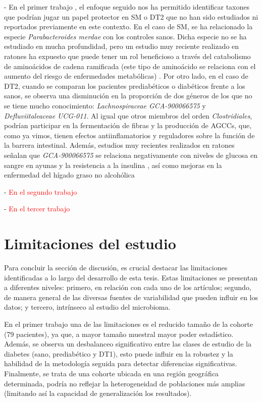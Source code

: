 - En el primer trabajo \cite{paper1}, el enfoque seguido nos ha permitido identificar taxones que podrían jugar un papel protector en SM o DT2 que no han sido estudiados ni reportados previamente en este contexto. En el caso de SM, se ha relacionado la especie \textit{Parabacteroides merdae} con los controles sanos. Dicha especie no se ha estudiado en mucha profundidad, pero un estudio muy reciente realizado en ratones ha expuesto que puede tener un rol beneficioso a través del catabolismo de aminoácidos de cadena ramificada (este tipo de aminoácido se relaciona con el aumento del riesgo de enfermedades metabólicas) \cite{qiao2022gut}. Por otro lado, en el caso de DT2, cuando se comparan los pacientes prediabéticos o diabéticos frente a los sanos, se observa una disminución en la proporción de dos géneros de los que no se tiene mucho conocimiento: \textit{Lachnospiraceae GCA-900066575} y \textit{Defluviitaleaceae UCG-011}. Al igual que otros miembros del orden \textit{Clostridiales}, podrían participar en la fermentación de fibras y la producción de AGCCs, que, como ya vimos, tienen efectos antiinflamatorios y reguladores sobre la función de la barrera intestinal. Además, estudios muy recientes realizados en ratones señalan que \textit{GCA-900066575} se relaciona negativamente con niveles de glucosa en sangre en ayunas y la resistencia a la insulina \cite{liu2023vitamin}, así como mejoras en la enfermedad del hígado graso no alcohólica \cite{qu2023akkermansia, guo2023protective}


- \textcolor{red}{En el segundo trabajo \cite{paper2}}



- \textcolor{red}{En el tercer trabajo \cite{paper3}}



\section{Limitaciones del estudio}

Para concluir la sección de discusión, es crucial destacar las limitaciones identificadas a lo largo del desarrollo de esta tesis. Estas limitaciones se presentan a diferentes niveles: primero, en relación con cada uno de los artículos; segundo, de manera general de las diversas fuentes de variabilidad que pueden influir en los datos; y tercero, intrínseco al estudio del microbioma.

En el primer trabajo \cite{paper1} una de las limitaciones es el reducido tamaño de la cohorte (79 pacientes), ya que, a mayor tamaño muestral mayor poder estadístico. Además, se observa un desbalanceo significativo entre las clases de estudio de la diabetes (sano, prediabético y DT1), esto puede influir en la robustez y la habilidad de la metodología seguida para detectar diferencias significativas. Finalmente, se trata de una cohorte ubicada en una región geográfica determinada, podría no reflejar la heterogeneidad de poblaciones más amplias (limitando así la capacidad de generalización los resultados).

